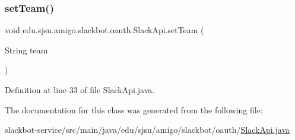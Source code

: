 \mbox{\label{classedu_1_1sjsu_1_1amigo_1_1slackbot_1_1oauth_1_1_slack_api_a1e51b0d1ac9b016a697dcf20b3ebb0f1}} 
\subsubsection{\texorpdfstring{set\+Team()}{setTeam()}}
{\footnotesize\ttfamily void edu.\+sjsu.\+amigo.\+slackbot.\+oauth.\+Slack\+Api.\+set\+Team (\begin{DoxyParamCaption}\item[{String}]{team }\end{DoxyParamCaption})}



Definition at line 33 of file Slack\+Api.\+java.



The documentation for this class was generated from the following file\+:\begin{DoxyCompactItemize}
\item 
slackbot-\/service/src/main/java/edu/sjsu/amigo/slackbot/oauth/\hyperlink{_slack_api_8java}{Slack\+Api.\+java}\end{DoxyCompactItemize}
